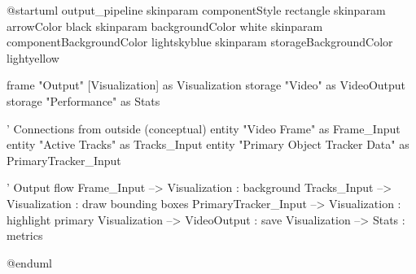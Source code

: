 \documentclass{scrartcl}
\begin{document}
\begin{plantuml}
@startuml output_pipeline
skinparam componentStyle rectangle
skinparam arrowColor black
skinparam backgroundColor white
skinparam componentBackgroundColor lightskyblue
skinparam storageBackgroundColor lightyellow


frame "Output" {
  [Visualization] as Visualization
  storage "Video\nOutput" as VideoOutput
  storage "Performance\nStats" as Stats
}

' Connections from outside (conceptual)
entity "Video Frame" as Frame_Input
entity "Active Tracks" as Tracks_Input
entity "Primary Object Tracker Data" as PrimaryTracker_Input

' Output flow
Frame_Input --> Visualization : background
Tracks_Input --> Visualization : draw bounding boxes
PrimaryTracker_Input --> Visualization : highlight primary
Visualization --> VideoOutput : save
Visualization --> Stats : metrics

@enduml

\end{plantuml}
\end{document}

